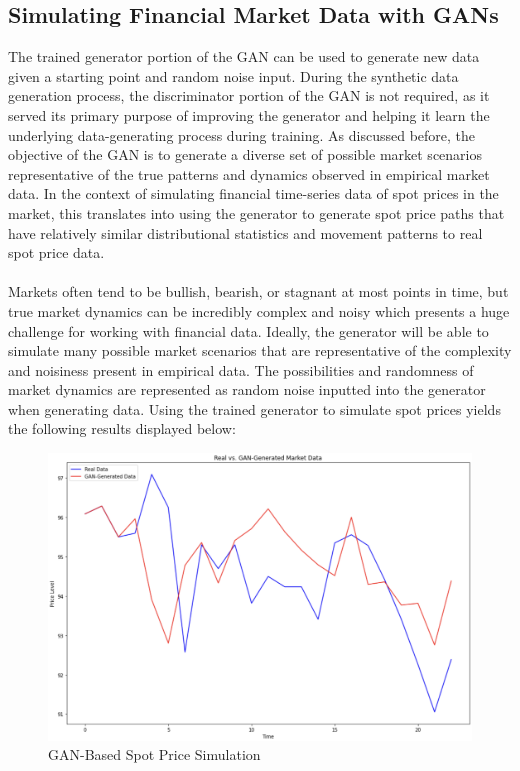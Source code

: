 \subsection{Simulating Financial Market Data with GANs}
The trained generator portion of the GAN can be used to generate new data given a starting point and random noise input. During the synthetic data generation process, the discriminator portion of the GAN is not required, as it served its primary purpose of improving the generator and helping it learn the underlying data-generating process during training. As discussed before, the objective of the GAN is to generate a diverse set of possible market scenarios representative of the true patterns and dynamics observed in empirical market data. In the context of simulating financial time-series data of spot prices in the market, this translates into using the generator to generate spot price paths that have relatively similar distributional statistics and movement patterns to real spot price data.
\\
\\
Markets often tend to be bullish, bearish, or stagnant at most points in time, but true market dynamics can be incredibly complex and noisy which presents a huge challenge for working with financial data. Ideally, the generator will be able to simulate many possible market scenarios that are representative of the complexity and noisiness present in empirical data. The possibilities and randomness of market dynamics are represented as random noise inputted into the generator when generating data. Using the trained generator to simulate spot prices yields the following results displayed below:
\begin{figure}[H]
\centering
\includegraphics[width=14cm]{templates/assets/gan/gan_stable.png}
\caption{GAN-Based Spot Price Simulation}
\end{figure}

